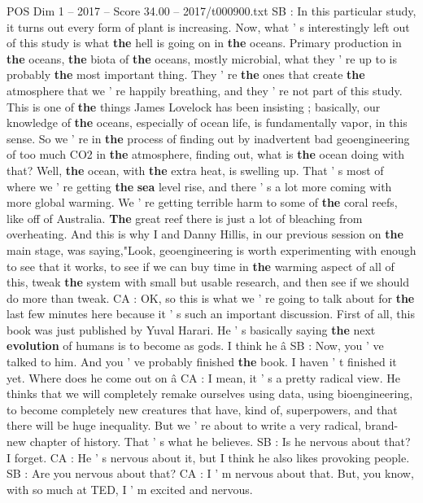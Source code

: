 \begin{textsample}{POS Dim 1 – 2017 – Score 34.00 – 2017/t000900.txt}
SB : In this particular study, it turns out every form of plant is increasing.
Now, what ' s interestingly left out of this study is what \textbf{the} hell is going on in \textbf{the} oceans.
Primary production in \textbf{the} oceans, \textbf{the} biota of \textbf{the} oceans, mostly microbial, what they ' re up to is probably \textbf{the} most important thing.
They ' re \textbf{the} ones that create \textbf{the} atmosphere that we ' re happily breathing, and they ' re not part of this study.
This is one of \textbf{the} things James Lovelock has been insisting ; basically, our knowledge of \textbf{the} oceans, especially of ocean life, is fundamentally vapor, in this sense.
So we ' re in \textbf{the} process of finding out by inadvertent bad geoengineering of too much CO2 in \textbf{the} atmosphere, finding out, what is \textbf{the} ocean doing with that?
Well, \textbf{the} ocean, with \textbf{the} extra heat, is swelling up.
That ' s most of where we ' re getting \textbf{the} \textbf{sea} level rise, and there ' s a lot more coming with more global warming.
We ' re getting terrible harm to some of \textbf{the} coral reefs, like off of Australia. \textbf{The} great reef there is just a lot of bleaching from overheating.
And this is why I and Danny Hillis, in our previous session on \textbf{the} main stage, was saying,"Look, geoengineering is worth experimenting with enough to see that it works, to see if we can buy time in \textbf{the} warming aspect of all of this, tweak \textbf{the} system with small but usable research, and then see if we should do more than tweak.
CA : OK, so this is what we ' re going to talk about for \textbf{the} last few minutes here because it ' s such an important discussion.
First of all, this book was just published by Yuval Harari.
He ' s basically saying \textbf{the} next \textbf{evolution} of humans is to become as gods.
I think he â SB : Now, you ' ve talked to him.
And you ' ve probably finished \textbf{the} book.
I haven ' t finished it yet.
Where does he come out on â CA : I mean, it ' s a pretty radical view.
He thinks that we will completely remake ourselves using data, using bioengineering, to become completely new creatures that have, kind of, superpowers, and that there will be huge inequality.
But we ' re about to write a very radical, brand-new chapter of history.
That ' s what he believes.
SB : Is he nervous about that?
I forget.
CA : He ' s nervous about it, but I think he also likes provoking people.
SB : Are you nervous about that?
CA : I ' m nervous about that.
But, you know, with so much at TED, I ' m excited and nervous.

\end{textsample}
